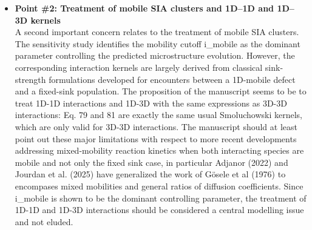 \documentclass{article}
\newif\ifshowauthornotes
\newcommand{\authornote}[1]{\ifshowauthornotes{\color{red}\ [\textbf{Author action:} #1]}\fi}
\newcommand{\hkl}[1]{\langle #1\rangle}
\begin{document}
\begin{itemize}
We have also added new physical content, so that the paper is not only architectural:
\begin{enumerate}[label=(\roman*)]
    \item The loop-character conversion kinetics, with three separate channels, completion probabilities and 1D correlation, explain the sigmoidal dose dependence of the $\hkl{100}$ fraction as a kinetic rather than thermodynamic transition (Section~4.2).
    \item Loops and cavities are incorporated into an evolving dislocation network (Class~VI).
    \item The rate kernels are reorganized by reaction dimensionality (Classes I--III), in direct response to the reviewer's second concern.
    \item The analysis of loop--cavity co-growth shows that, for iron cascade statistics, co-growth is a production-bias rather than an elastic-bias phenomenon (Section~3.1 and Supplementary Section~S4.2).
\end{enumerate}

Regarding length and repetition, the formulation sections have been consolidated. The duplicated equations (the former Eqs.~(25) and (29)) and the parallel listings of abstract and EUROFER97 process classes have been merged into a single table (Table~1). The derivations of the rate kernels, the conservation identities and the reductions have been moved to the Supplementary Material, so that the main text contains only their results.

\authornote{Consider stating the reduced page count of the main text relative to the original submission.}

\item \textbf{Point \#2: Treatment of mobile SIA clusters and 1D--1D and 1D--3D kernels}\\
A second important concern relates to the treatment of mobile SIA clusters. The sensitivity study identifies the mobility cutoff i\_mobile as the dominant parameter controlling the predicted microstructure evolution. However, the corresponding interaction kernels are largely derived from classical sink-strength formulations developed for encounters between a 1D-mobile defect and a fixed-sink population. The proposition of the manuscript seems to be to treat 1D-1D interactions and 1D-3D with the same expressions as 3D-3D interactions: Eq. 79 and 81 are exactly the same usual Smoluchowski kernels, which are only valid for 3D-3D interactions. The manuscript should at least point out these major limitations with respect to more recent developments addressing mixed-mobility reaction kinetics when both interacting species are mobile and not only the fixed sink case, in particular Adjanor (2022) and Jourdan et al. (2025) have generalized the work of Gösele et al (1976) to encompases mixed mobilities and general ratios of diffusion coefficients. Since i\_mobile is shown to be the dominant controlling parameter, the treatment of 1D-1D and 1D-3D interactions should be considered a central modelling issue and not eluded.\\


\end{itemize}
\end{document}

